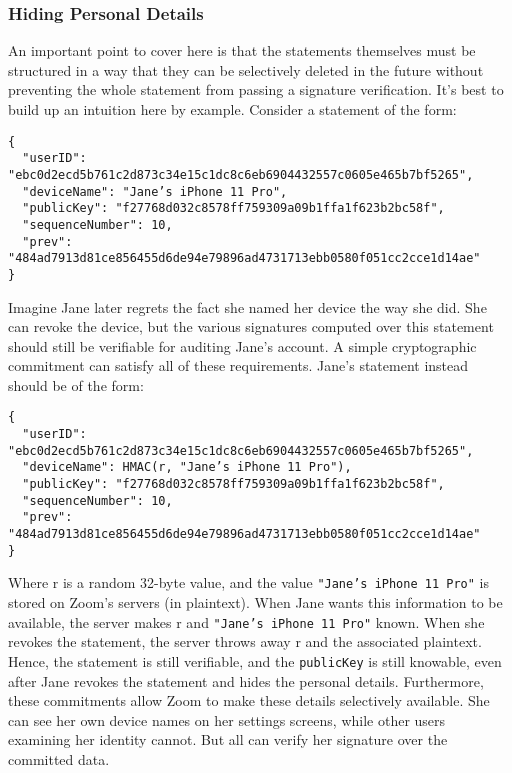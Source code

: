 \subsubsection{Hiding Personal Details}

An important point to cover here is that the statements themselves must be structured in a way that they can be selectively deleted in the future without preventing the whole statement from passing a signature verification. It's best to build up an intuition here by example. Consider a statement of the form:

\begingroup{}
\fontsize{10pt}{12pt}\selectfont{}
\begin{verbatim}
{
  "userID": "ebc0d2ecd5b761c2d873c34e15c1dc8c6eb6904432557c0605e465b7bf5265",
  "deviceName": "Jane’s iPhone 11 Pro",
  "publicKey": "f27768d032c8578ff759309a09b1ffa1f623b2bc58f",
  "sequenceNumber": 10,
  "prev": "484ad7913d81ce856455d6de94e79896ad4731713ebb0580f051cc2cce1d14ae"
}
\end{verbatim}
\endgroup{}

Imagine Jane later regrets the fact she named her device the way she did. She can revoke the device, but the various signatures computed over this statement should still be verifiable for auditing Jane's account. A simple cryptographic commitment can satisfy all of these requirements. Jane's statement instead should be of the form:

\begingroup{}
\fontsize{10pt}{12pt}\selectfont{}
\begin{verbatim}
{
  "userID": "ebc0d2ecd5b761c2d873c34e15c1dc8c6eb6904432557c0605e465b7bf5265",
  "deviceName": HMAC(r, "Jane’s iPhone 11 Pro"),
  "publicKey": "f27768d032c8578ff759309a09b1ffa1f623b2bc58f",
  "sequenceNumber": 10,
  "prev": "484ad7913d81ce856455d6de94e79896ad4731713ebb0580f051cc2cce1d14ae"
}
\end{verbatim}
\endgroup{}

Where $\mathrm{r}$ is a random 32-byte value, and the value \texttt{"Jane’s iPhone 11 Pro"} is stored on Zoom's servers (in plaintext). When Jane wants this information to be available, the server makes $\mathrm{r}$ and \texttt{"Jane’s iPhone 11 Pro"} known. When she revokes the statement, the server throws away $\mathrm{r}$ and the associated plaintext. Hence, the statement is still verifiable, and the \texttt{publicKey} is still knowable, even after Jane revokes the statement and hides the personal details. Furthermore, these commitments allow Zoom to make these details selectively available. She can see her own device names on her settings screens, while other users examining her identity cannot. But all can verify her signature over the committed data.

